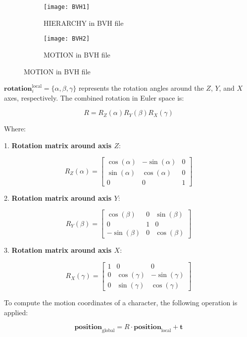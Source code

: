 \begin{figure}[htbp]
	\centering
	\begin{subfigure}{0.49\textwidth}
		\centering
		\texttt{[image: BVH1]}
		\caption{HIERARCHY in BVH file}
		\label{fig:BVH1}
	\end{subfigure}
	\hfill
	\begin{subfigure}{0.49\textwidth}
		\centering
		\texttt{[image: BVH2]}
		\caption{MOTION in BVH file}
		\label{fig:BVH2}
	\end{subfigure}
\end{figure}

$\mathbf{rotation}_i^{\operatorname{local}} = \{ \alpha ,\beta , \gamma \}$ represents the rotation angles around the $Z$, $Y$, and $X$ axes, respectively. The combined rotation in Euler space is:

\begin{equation}
R = R_Z(\alpha) R_Y(\beta) R_X(\gamma)
\end{equation}

Where:

1. \textbf{Rotation matrix around axis \(Z\)}:

\[
R_Z(\alpha) = 
\begin{bmatrix}
	\cos(\alpha) & -\sin(\alpha) & 0 \\
	\sin(\alpha) & \cos(\alpha) & 0 \\
	0 & 0 & 1
\end{bmatrix}
\]

2. \textbf{Rotation matrix around axis \(Y\)}:

\[
R_Y(\beta) = 
\begin{bmatrix}
	\cos(\beta) & 0 & \sin(\beta) \\
	0 & 1 & 0 \\
	-\sin(\beta) & 0 & \cos(\beta)
\end{bmatrix}
\]

3. \textbf{Rotation matrix around axis \(X\)}:

\[
R_X(\gamma) = 
\begin{bmatrix}
	1 & 0 & 0 \\
	0 & \cos(\gamma) & -\sin(\gamma) \\
	0 & \sin(\gamma) & \cos(\gamma)
\end{bmatrix}
\]

To compute the motion coordinates of a character, the following operation is applied:

\begin{equation}
	\mathbf{position}_{\text{global}} = R \cdot \mathbf{position}_{\text{local}} + \mathbf{t}
\end{equation}


